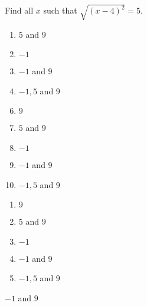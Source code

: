 

 Find all $x$ such that $\sqrt{(x-4)^{2}}=5.$


\ifsat
	\begin{enumerate}[label=\Alph*)]
		\item  $5$ and $9$
		\item  $-1$
		\item  $-1$ and $9$%
		\item  $-1,5$ and $9$
	\end{enumerate}
\else
\fi

\ifacteven
	\begin{enumerate}[label=\textbf{\Alph*.},itemsep=\fill,align=left]
		\setcounter{enumii}{5}
		\item   $9$
		\item  $5$ and $9$
		\item  $-1$
		\addtocounter{enumii}{1}
		\item  $-1$ and $9$%
		\item  $-1,5$ and $9$
	\end{enumerate}
\else
\fi

\ifactodd
	\begin{enumerate}[label=\textbf{\Alph*.},itemsep=\fill,align=left]
		\item   $9$
		\item  $5$ and $9$
		\item  $-1$
		\item  $-1$ and $9$%
		\item  $-1,5$ and $9$
	\end{enumerate}
\else
\fi

\ifgridin
  $-1$ and $9$%
		
\else
\fi

